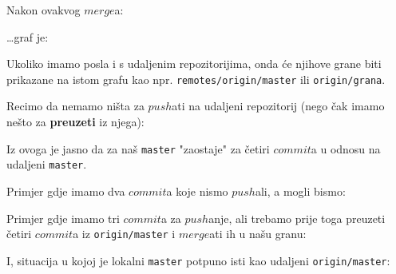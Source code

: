 
Nakon ovakvog $merge$a:



\dots{}graf je:



Ukoliko imamo posla i s udaljenim repozitorijima, onda će njihove grane biti prikazane na istom grafu kao npr. \verb+remotes/origin/master+ ili \verb+origin/grana+.

Recimo da nemamo ništa za $push$ati na udaljeni repozitorij (nego čak imamo nešto za \textbf{preuzeti} iz njega):


Iz ovoga je jasno da za naš \verb+master+ "zaostaje" za četiri $commit$a u odnosu na udaljeni \verb+master+.

Primjer gdje imamo dva $commit$a koje nismo $push$ali, a mogli bismo:


Primjer gdje imamo tri $commit$a za $push$anje, ali trebamo prije toga preuzeti četiri $commit$a iz \verb+origin/master+ i $merge$ati ih u našu granu:


I, situacija u kojoj je lokalni \verb+master+ potpuno isti kao udaljeni \verb+origin/master+:


